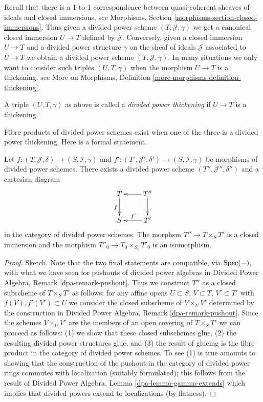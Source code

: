 \noindent
Recall that there is a 1-to-1 correspondence between quasi-coherent
sheaves of ideals and closed immersions, see
Morphisms, Section \ref{morphisms-section-closed-immersions}.
Thus given a divided power scheme $(T, \mathcal{J}, \gamma)$ we
get a canonical closed immersion $U \to T$ defined by $\mathcal{J}$.
Conversely, given a closed immersion $U \to T$ and a divided power
structure $\gamma$ on the sheaf of ideals $\mathcal{J}$ associated
to $U \to T$ we obtain a divided power scheme $(T, \mathcal{J}, \gamma)$.
In many situations we only want to consider such triples
$(U, T, \gamma)$ when the morphism $U \to T$ is a thickening, see
More on Morphisms, Definition \ref{more-morphisms-definition-thickening}.

\begin{definition}
\label{definition-divided-power-thickening}
A triple $(U, T, \gamma)$ as above is called a {\it divided power thickening}
if $U \to T$ is a thickening.
\end{definition}

\noindent
Fibre products of divided power schemes exist when one of the
three is a divided power thickening. Here is a formal statement.

\begin{lemma}
\label{lemma-fibre-product}
Let $f : (T, \mathcal{J}, \delta) \to (S, \mathcal{I}, \gamma)$ and
$f' : (T', \mathcal{J}', \delta') \to (S, \mathcal{I}, \gamma)$
be morphisms of divided power schemes. There exists a divided power scheme
$(T'', \mathcal{J}'', \delta'')$ and a cartesian diagram
$$
\xymatrix{
T \ar[d]_f & T'' \ar[d] \ar[l] \\
S & T' \ar[l]_{f'}
}
$$
in the category of divided power schemes. The morphsm
$T'' \to T \times_S T'$ is a closed immersion and the morphism
$T''_0 \to T_0 \times_{S_0} T'_0$ is an isomorphism.
\end{lemma}

\begin{proof}
Sketch. Note that the two final statements are compatible, via $\mathop{\mathrm{Spec}}(-)$,
with what we have seen for pushouts of divided power algebras in
Divided Power Algebra, Remark \ref{dpa-remark-pushout}.
Thus we construct $T''$ as a closed subscheme of $T \times_S T'$
as follows: for any affine opens $U \subset S$, $V \subset T$,
$V' \subset T'$ with $f(V), f'(V') \subset U$ we consider the closed
subscheme of $V \times_U V'$ determined by the construction in
Divided Power Algebra, Remark \ref{dpa-remark-pushout}. Since the
schemes $V \times_U V'$ are the members of an open covering
of $T \times_S T'$ we can proceed as follows: (1) we show that these
closed subschemes glue, (2) the resulting
divided power structures glue, and (3) the result of glueing
is the fibre product in the category of divided power schemes.
To see (1) is true amounts to showing
that the construction of the pushout in the category of
divided power rings commutes with localization (suitably
formulated); this follows from the result of
Divided Power Algebra, Lemma \ref{dpa-lemma-gamma-extends} which implies
that divided powers extend to localizations (by flatness).
\end{proof}

